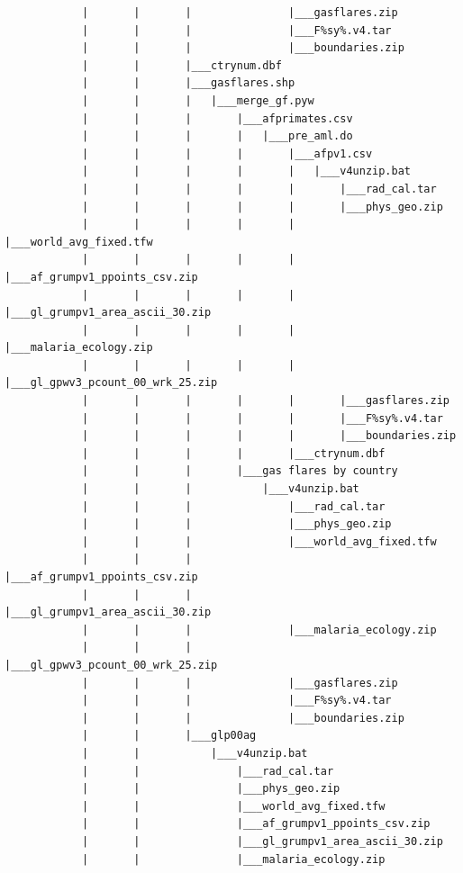 \documentclass[]{book}
\begin{document}
\begin{verbatim}
            |       |       |               |___gasflares.zip
            |       |       |               |___F%sy%.v4.tar
            |       |       |               |___boundaries.zip
            |       |       |___ctrynum.dbf
            |       |       |___gasflares.shp
            |       |       |   |___merge_gf.pyw
            |       |       |       |___afprimates.csv
            |       |       |       |   |___pre_aml.do
            |       |       |       |       |___afpv1.csv
            |       |       |       |       |   |___v4unzip.bat
            |       |       |       |       |       |___rad_cal.tar
            |       |       |       |       |       |___phys_geo.zip
            |       |       |       |       |       |___world_avg_fixed.tfw
            |       |       |       |       |       |___af_grumpv1_ppoints_csv.zip
            |       |       |       |       |       |___gl_grumpv1_area_ascii_30.zip
            |       |       |       |       |       |___malaria_ecology.zip
            |       |       |       |       |       |___gl_gpwv3_pcount_00_wrk_25.zip
            |       |       |       |       |       |___gasflares.zip
            |       |       |       |       |       |___F%sy%.v4.tar
            |       |       |       |       |       |___boundaries.zip
            |       |       |       |       |___ctrynum.dbf
            |       |       |       |___gas flares by country
            |       |       |           |___v4unzip.bat
            |       |       |               |___rad_cal.tar
            |       |       |               |___phys_geo.zip
            |       |       |               |___world_avg_fixed.tfw
            |       |       |               |___af_grumpv1_ppoints_csv.zip
            |       |       |               |___gl_grumpv1_area_ascii_30.zip
            |       |       |               |___malaria_ecology.zip
            |       |       |               |___gl_gpwv3_pcount_00_wrk_25.zip
            |       |       |               |___gasflares.zip
            |       |       |               |___F%sy%.v4.tar
            |       |       |               |___boundaries.zip
            |       |       |___glp00ag
            |       |           |___v4unzip.bat
            |       |               |___rad_cal.tar
            |       |               |___phys_geo.zip
            |       |               |___world_avg_fixed.tfw
            |       |               |___af_grumpv1_ppoints_csv.zip
            |       |               |___gl_grumpv1_area_ascii_30.zip
            |       |               |___malaria_ecology.zip

\end{verbatim}
\end{document}
